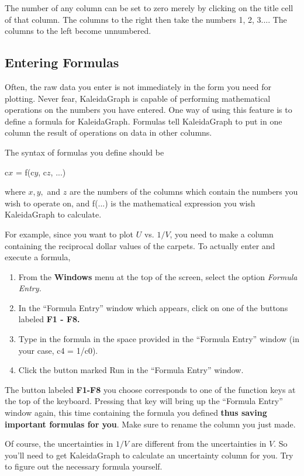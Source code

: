 The number of any column can be set to zero merely by clicking on the
title cell of that column. The columns to the right then take the
numbers 1, 2, 3.... The columns to the left become unnumbered.

\subsection{Entering Formulas}

Often, the raw data you enter is not immediately in the form you need
for plotting.  Never fear, KaleidaGraph is capable of performing
mathematical operations on the numbers you have entered. One way of
using this feature is to define a formula for KaleidaGraph. Formulas
tell KaleidaGraph to put in one column the result of operations on
data in other columns.

The syntax of formulas you define should be
\begin{center}
c$x$ = f(c$y$, c$z$, ...)
\end{center}
where $x, y,$ and $z$ are the numbers of the columns which contain the
numbers you wish to operate on, and f(...) is the mathematical
expression you wish KaleidaGraph to calculate.

For example, since you want to plot $U$ vs. $1/V$,
you need to make a column containing
the reciprocal dollar values of the carpets.  
To actually enter and execute a formula,

\noindent
\begin{enumerate}
\item From the {\bf Windows} menu at the top of the screen, select the option {\it
Formula Entry.}
\item In the ``Formula Entry'' window which appears, click on one of the buttons 
labeled {\bf F1 - F8.}
\item Type in the formula in the space provided in the ``Formula Entry'' window (in your case, c4 = 1/c0).
\item Click the button marked Run in the ``Formula Entry'' window.
\end{enumerate}
\indent

The button labeled {\bf F1-F8} you choose corresponds to one of the
function keys at the top of the keyboard. Pressing that key will bring
up the ``Formula Entry'' window again, this time containing the
formula you defined {\bf thus saving important formulas for you}. Make 
sure to rename the column you just made.

Of course, the uncertainties in $1/V$ are different from the
uncertainties in $V.$ So you'll need to get KaleidaGraph to calculate
an uncertainty column for you. Try to figure out the necessary formula
yourself.

